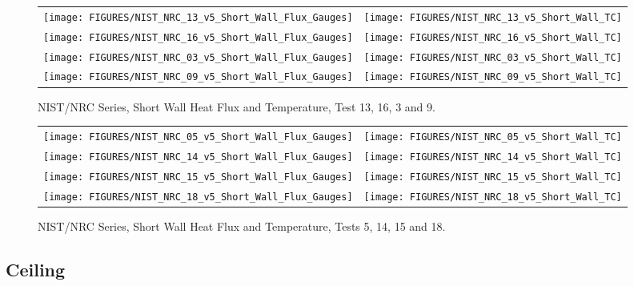 \begin{figure}[p]
\begin{tabular*}{\textwidth}{l@{\extracolsep{\fill}}r}
\texttt{[image: FIGURES/NIST\_NRC\_13\_v5\_Short\_Wall\_Flux\_Gauges]} &
\texttt{[image: FIGURES/NIST\_NRC\_13\_v5\_Short\_Wall\_TC]} \\
\texttt{[image: FIGURES/NIST\_NRC\_16\_v5\_Short\_Wall\_Flux\_Gauges]} &
\texttt{[image: FIGURES/NIST\_NRC\_16\_v5\_Short\_Wall\_TC]} \\
\texttt{[image: FIGURES/NIST\_NRC\_03\_v5\_Short\_Wall\_Flux\_Gauges]} &
\texttt{[image: FIGURES/NIST\_NRC\_03\_v5\_Short\_Wall\_TC]} \\
\texttt{[image: FIGURES/NIST\_NRC\_09\_v5\_Short\_Wall\_Flux\_Gauges]} &
\texttt{[image: FIGURES/NIST\_NRC\_09\_v5\_Short\_Wall\_TC]}

\end{tabular*}
\caption{NIST/NRC Series, Short Wall Heat Flux and Temperature, Test 13, 16, 3 and 9.}
\label{NIST_NRC_Short_3}
\end{figure}

\begin{figure}[p]
\begin{tabular*}{\textwidth}{l@{\extracolsep{\fill}}r}
\texttt{[image: FIGURES/NIST\_NRC\_05\_v5\_Short\_Wall\_Flux\_Gauges]} &
\texttt{[image: FIGURES/NIST\_NRC\_05\_v5\_Short\_Wall\_TC]} \\
\texttt{[image: FIGURES/NIST\_NRC\_14\_v5\_Short\_Wall\_Flux\_Gauges]} &
\texttt{[image: FIGURES/NIST\_NRC\_14\_v5\_Short\_Wall\_TC]} \\
\texttt{[image: FIGURES/NIST\_NRC\_15\_v5\_Short\_Wall\_Flux\_Gauges]} &
\texttt{[image: FIGURES/NIST\_NRC\_15\_v5\_Short\_Wall\_TC]} \\
\texttt{[image: FIGURES/NIST\_NRC\_18\_v5\_Short\_Wall\_Flux\_Gauges]} &
\texttt{[image: FIGURES/NIST\_NRC\_18\_v5\_Short\_Wall\_TC]}
\end{tabular*}
\caption{NIST/NRC Series, Short Wall Heat Flux and Temperature, Tests 5, 14, 15 and 18.}
\label{NIST_NRC_Short_4}
\end{figure}

\clearpage



\subsection{Ceiling}

\vspace{2in}



